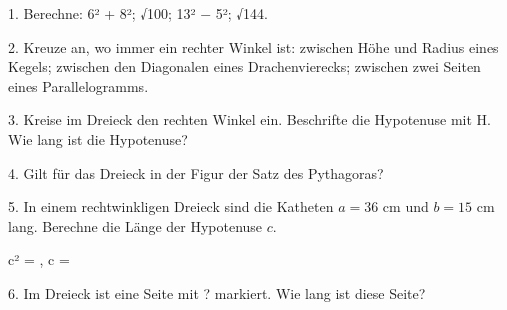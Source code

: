 \documentclass[11pt]{article}
\begin{document}
\pfheftstil
{}
\pfrueckblick
\begin{pfaufg}{}{1.}{}
Berechne: 6² + 8²; √100; 13² $-$ 5²; √144.
\end{pfaufg}
\begin{pfaufg}{}{2.}{}
Kreuze an, wo immer ein rechter Winkel ist: zwischen Höhe und Radius eines Kegels; zwischen den Diagonalen eines Drachenvierecks; zwischen zwei Seiten eines Parallelogramms.
\end{pfaufg}
\begin{pfaufg}{}{3.}{}
Kreise im Dreieck den rechten Winkel ein. Beschrifte die Hypotenuse mit H. Wie lang ist die Hypotenuse?
\par\smallskip\noindent {}\par
\par\noindent \leerfeld[cm] \par
{}
\end{pfaufg}
\begin{pfaufg}{}{4.}{}
Gilt für das Dreieck in der Figur der Satz des Pythagoras? \janein
\par\smallskip\noindent {}\par
{}
\end{pfaufg}
\par{}\par
\pfgruppe{}
\begin{pfaufg}{}{5.}{}
In einem rechtwinkligen Dreieck sind die Katheten $a = 36$ cm und $b = 15$ cm lang. Berechne die Länge der Hypotenuse $c$.
\par\noindent c² = \leerfeld , c = \leerfeld[cm] \par
{}
\end{pfaufg}
\begin{pfaufg}{}{6.}{}
Im Dreieck ist eine Seite mit ? markiert. Wie lang ist diese Seite?
\par\smallskip\noindent {}\par
\par\noindent \leerfeld[cm] \par
{}
\end{pfaufg}
\end{document}
